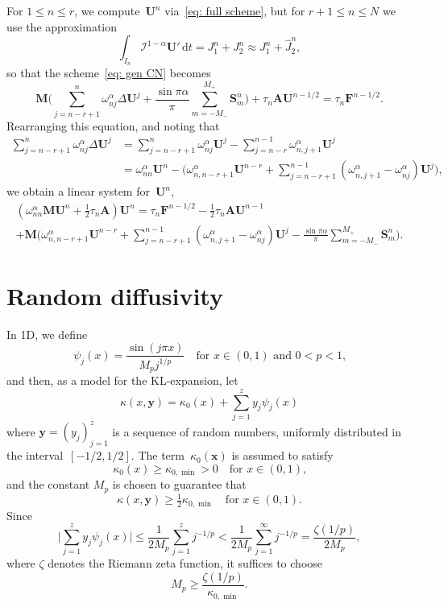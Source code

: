 \documentclass[a4paper,12pt]{article}
\newcommand{\bs}[1]{\boldsymbol{#1}}
\newcommand{\ud}{\mathrm{d}}
\begin{document}
For $1\le n\le r$, we compute~$\bs{U}^n$ via~\eqref{eq: full scheme}, but for
$r+1\le n\le N$ we use the approximation
\[
\int_{I_n}\mathcal{I}^{1-\alpha}\bs{U}'\,\ud t=J_1^n+J_2^n
    \approx J_1^n+\hat J_2^n,
\]
so that the scheme~\eqref{eq: gen CN} becomes
\[
\bs{M}\biggl(\sum_{j=n-r+1}^n \omega^\alpha_{nj}\Delta\bs{U}^j
    +\frac{\sin\pi\alpha}{\pi}\sum_{m=-M_-}^{M_+} \bs{S}^n_m\biggr)
    +\tau_n\bs{A}\bs{U}^{n-1/2}=\tau_n\bs{F}^{n-1/2}.
\]
Rearranging this equation, and noting that
\begin{align*}
\sum_{j=n-r+1}^n\omega^\alpha_{nj}\Delta\bs{U}^j
    &=\sum_{j=n-r+1}^n\omega^\alpha_{nj}\bs{U}^j
    -\sum_{j=n-r}^{n-1}\omega^\alpha_{n,j+1}\bs{U}^j\\
    &=\omega^\alpha_{nn}\bs{U}^n-\biggl(\omega^\alpha_{n,n-r+1}\bs{U}^{n-r}
    +\sum_{j=n-r+1}^{n-1}(\omega^\alpha_{n,j+1}-\omega^\alpha_{nj})\bs{U}^j
    \biggr),
\end{align*}
we obtain a linear system for~$\bs{U}^n$,
\begin{multline*}
(\omega^\alpha_{nn}\bs{M}\bs{U}^n+\tfrac12\tau_n\bs{A})\bs{U}^n
    =\tau_n\bs{F}^{n-1/2}-\tfrac12\tau_n\bs{A}\bs{U}^{n-1}\\
    +\bs{M}\biggl(\omega^\alpha_{n,n-r+1}\bs{U}^{n-r}
    +\sum_{j=n-r+1}^{n-1}(\omega^\alpha_{n,j+1}-\omega^\alpha_{nj})\bs{U}^j
    -\frac{\sin\pi\alpha}{\pi}\sum_{m=-M_-}^{M_+}\bs{S}^n_m\biggr).
\end{multline*}

\section{Random diffusivity}

In 1D, we define
\[
\psi_j(x)=\frac{\sin(j\pi x)}{M_pj^{1/p}}
    \quad\text{for $x\in(0,1)$ and $0<p<1$,}
\]
and then, as a model for the KL-expansion, let
\[
\kappa(x,\bs{y})=\kappa_0(x)+\sum_{j=1}^z y_j\psi_j(x)
\]
where $\bs{y}=(y_j)_{j=1}^z$ is a sequence of random numbers, uniformly
distributed in the interval~$[-1/2,1/2]$.  The term~$\kappa_0(\bs{x})$ is
assumed to satisfy
\[
\kappa_0(x)\ge\kappa_{0,\min}>0\quad\text{for $x\in(0,1)$,}
\]
and the constant $M_p$ is chosen to guarantee that
\[
\kappa(x,\bs{y})\ge\tfrac12\kappa_{0,\min}\quad\text{for $x\in(0,1)$.}
\]
Since
\[
\biggl|\sum_{j=1}^zy_j\psi_j(x)\biggr|\le\frac{1}{2M_p}\sum_{j=1}^zj^{-1/p}
    <\frac{1}{2M_p}\sum_{j=1}^\infty j^{-1/p}=\frac{\zeta(1/p)}{2M_p},
\]
where $\zeta$ denotes the Riemann zeta function, it suffices to choose
\[
M_p\ge\frac{\zeta(1/p)}{\kappa_{0,\min}}.
\]
\end{document}
